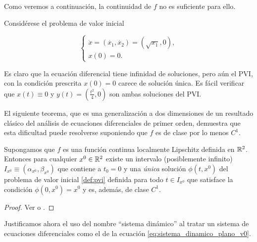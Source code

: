 Como veremos a continuación, la continuidad de $f$ no es suficiente para ello.

\begin{example}Considérese el problema de valor inicial
    
$$
\left\{
    \begin{array}{l}
        \dot{x} = (\dot{x_1}, \dot{x_2}) = (\sqrt{x_1}, 0), \\
        x(0) = 0.
    \end{array}
\right.
$$

Es claro que la ecuación diferencial tiene infinidad de soluciones, pero aún el PVI, con la condición prescrita $x(0) = 0$ carece de solución única. Es fácil verificar que $x(t) \equiv 0$ y $y(t) = (\frac{t^2}{4}, 0) $ son ambas soluciones del PVI.
\end{example}

El siguiente teorema, que es una generalización a dos dimensiones de un resultado clásico del análisis de ecuaciones diferenciales de primer orden, demuestra que esta dificultad puede resolverse suponiendo que $f$ es de clase por lo menos $C^1$.

\begin{theorem} \label{teo:existenciayunicidad} Supongamos que $f$ es una función continua localmente Lipschitz definida en ${\mathbb{R}}^2$. Entonces para cualquier $x^0 \in {\ensuremath{\mathbb{R}}}^2$ existe un intervalo (posiblemente infinito) $I_{x^0} \equiv (\alpha_{x^0}, \beta_{x^0})$ que contiene a $t_0 = 0$ y una \emph{única} solución $\phi(t,x^0)$ del problema de valor inicial \ref{def:pvi} definida para todo $t \in I_{x^0}$ que satisface la condición $\phi(0, x^0) = x^0$ y es, además, de clase $C^1$.
\begin{proof}
Ver \cite[p.~10]{barrvalls} o \cite[p.~163]{smale}.
\end{proof}
\end{theorem}

Justificamos ahora el uso del nombre ``sistema dinámico'' al tratar un sistema de ecuaciones diferenciales como el de la ecuación \ref{eq:sistema_dinamico_plano_v0}.

